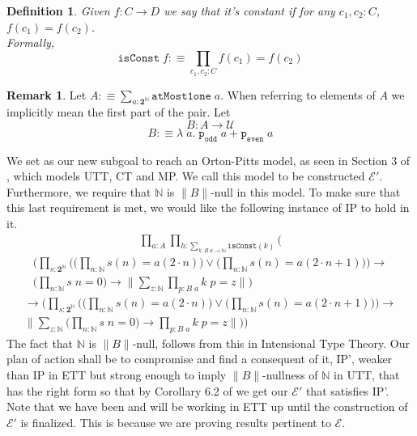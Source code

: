 \documentclass[12pt]{report}
\newtheorem{defn}[thm]{Definition}
\theoremstyle{definition}
\newtheorem{rem}[thm]{Remark}
\begin{document}
\begin{defn}
Given $f : C \rightarrow D$ we say that it's constant if for any $c_1,c_2 : C$, $f(c_1) = f(c_2)$.\\
Formally,
$$\mathtt{isConst}\; f :\equiv \prod_{c_1,c_2 : C}f(c_1) = f(c_2)$$
\end{defn}
\begin{rem}\label{AandB}
Let $A :\equiv \sum_{a: \mathbf{2}^\mathbb{N}}\mathtt{atMost1one}\;a$. 
When referring to elements of $A$ we implicitly mean the first part of the pair. 
Let
$$B : A \rightarrow \mathcal{U}$$
$$B :\equiv \lambda\; a.\; \mathtt{p_{odd}}\; a + \mathtt{p_{even}}\; a$$
\end{rem}
We set as our new subgoal to reach an Orton-Pitts model, as seen in Section 3 of \cite{1905.03014}, which models UTT, CT and MP. 
We call this model to be constructed $\mathcal{E}'$. 
Furthermore, we require that $\mathbb{N}$ is $\lVert B \rVert$-null in this model. 
To make sure that this last requirement is met, we would like the following instance of IP to hold in it. 
\begin{multline*}
\prod_{a: A} \prod_{h : \sum_{k : B\;a \rightarrow \mathbb{N}}\mathtt{isConst}(k)} \Bigg( 
\end{multline*}
\begin{multline*}
\bigg( \prod_{s : \mathbf{2}^\mathbb{N}} \Big(\big(\prod_{n : \mathbb{N}} s(n) = a(2 \cdot n)\big) \vee \big(\prod_{n : \mathbb{N}} s(n) = a(2\cdot n +1)\big) \Big) \rightarrow \\
	 \Big(\prod_{n : \mathbb{N}}s\; n = 0 \Big) \rightarrow \Big\lVert \sum_{z : \mathbb{N}}\prod_{p: B\; a}  k\; p = z \Big\rVert \bigg)
\end{multline*}
\begin{multline*}
\rightarrow \bigg( \prod_{s : \mathbf{2}^\mathbb{N}} \Big(\big(\prod_{n : \mathbb{N}} s(n) = a(2 \cdot n)\big) \vee \big(\prod_{n : \mathbb{N}} s(n) = a(2\cdot n +1)\big) \Big) \rightarrow \\
	  \Big\lVert \sum_{z : \mathbb{N}} \Big(\prod_{n : \mathbb{N}}s\; n = 0 \Big) \rightarrow \prod_{p : B\; a} k\; p = z \Big\rVert \bigg) \Bigg)
\end{multline*}
The fact that $\mathbb{N}$ is $\lVert B \rVert$-null, follows from this in Intensional Type Theory. 
Our plan of action shall be to compromise and find a consequent of it, IP', weaker than IP in ETT but strong enough to imply $\lVert B \rVert$-nullness of $\mathbb{N}$ in UTT, that has the right form so that by Corollary 6.2 of \cite{1905.03014} we get our $\mathcal{E}'$ that satisfies IP'. 
Note that we have been and will be working in ETT up until the construction of $\mathcal{E}'$ is finalized. 
This is because we are proving results pertinent to $\mathcal{E}$. 
\end{document}
